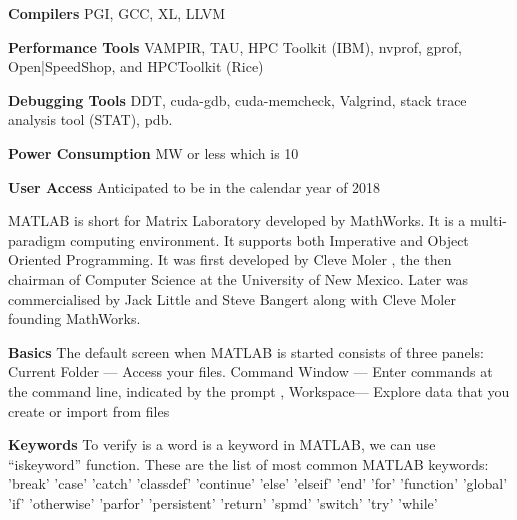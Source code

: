 \documentclass[fleqn,letterpaper,12pt]{report}
\begin{document}
\textbf{Compilers} \newline
PGI, GCC, XL, LLVM 

\textbf{Performance Tools} \newline
VAMPIR, TAU, HPC Toolkit (IBM), nvprof, gprof, Open|SpeedShop, and HPCToolkit (Rice) 

\textbf{Debugging Tools} \newline
DDT, cuda-gdb, cuda-memcheck, Valgrind, stack trace analysis tool (STAT), pdb.

\textbf{Power Consumption}  MW or less which is 10%

\textbf{User Access} \newline
Anticipated to be in the calendar year of 2018 \newline 


\vfill

%
\newpage
{}
{}
\problem
MATLAB is short for Matrix Laboratory developed by MathWorks.  It is a multi-paradigm computing environment. It supports both Imperative and Object Oriented Programming. It was first developed by Cleve Moler , the then chairman of Computer Science at the University of New Mexico. Later was commercialised by Jack Little and Steve Bangert along with Cleve Moler founding MathWorks. 

\textbf{Basics}\newline
The default screen when MATLAB is started consists of three panels:
Current Folder — Access your files. 
Command Window — Enter commands at the command line, indicated by the prompt ,
Workspace— Explore data that you create or import from files

\textbf{Keywords}\newline
To verify is a word is a keyword in MATLAB, we can use “iskeyword” function.\newline
These are the list of most common MATLAB keywords:\newline
	'break'\newline
    'case'\newline
    'catch'\newline
    'classdef'\newline
    'continue'\newline
    'else'\newline
    'elseif'\newline
    'end'\newline
    'for'\newline
    'function'\newline
    'global'\newline
    'if'\newline
    'otherwise'\newline
    'parfor'\newline
    'persistent'\newline
    'return'\newline
    'spmd'\newline
    'switch'\newline
    'try'\newline
    'while'
	
\end{document}
